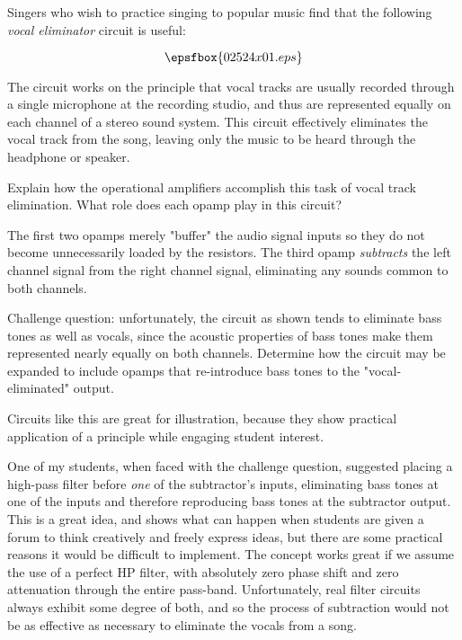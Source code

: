 

Singers who wish to practice singing to popular music find that the following {\it vocal eliminator} circuit is useful:

$$\epsfbox{02524x01.eps}$$

The circuit works on the principle that vocal tracks are usually recorded through a single microphone at the recording studio, and thus are represented equally on each channel of a stereo sound system.  This circuit effectively eliminates the vocal track from the song, leaving only the music to be heard through the headphone or speaker.

Explain how the operational amplifiers accomplish this task of vocal track elimination.  What role does each opamp play in this circuit?







The first two opamps merely "buffer" the audio signal inputs so they do not become unnecessarily loaded by the resistors.  The third opamp {\it subtracts} the left channel signal from the right channel signal, eliminating any sounds common to both channels.

\vskip 10pt

Challenge question: unfortunately, the circuit as shown tends to eliminate bass tones as well as vocals, since the acoustic properties of bass tones make them represented nearly equally on both channels.  Determine how the circuit may be expanded to include opamps that re-introduce bass tones to the "vocal-eliminated" output.







Circuits like this are great for illustration, because they show practical application of a principle while engaging student interest.

One of my students, when faced with the challenge question, suggested placing a high-pass filter before {\it one} of the subtractor's inputs, eliminating bass tones at one of the inputs and therefore reproducing bass tones at the subtractor output.  This is a great idea, and shows what can happen when students are given a forum to think creatively and freely express ideas, but there are some practical reasons it would be difficult to implement.  The concept works great if we assume the use of a perfect HP filter, with absolutely zero phase shift and zero attenuation through the entire pass-band.  Unfortunately, real filter circuits always exhibit some degree of both, and so the process of subtraction would not be as effective as necessary to eliminate the vocals from a song.




